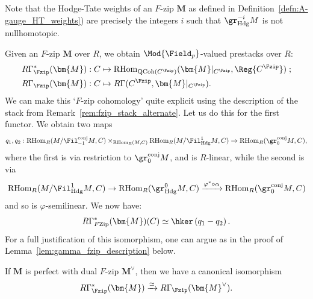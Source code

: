 \documentclass[10pt]{amsart}
\begin{document}
\begin{remark}
\label{rem:fzip_ht_weights}
Note that the Hodge-Tate weights of an $F$-zip $\bm{M}$ as defined in Definition~\ref{defn:A-gauge_HT_weights}) are precisely the integers $i$ such that $\gr^{-i}_{\mathrm{Hdg}}M$ is not nullhomotopic.
\end{remark}


\begin{construction}
\label{const:fzip_cohomology}
Given an $F$-zip $\bm{M}$ over $R$, we obtain $\Mod{\Field_p}$-valued prestacks over $R$:
\begin{align*}
R\Gamma^*_{\Fzip}(\bm{M}):C&\mapsto \mathrm{RHom}_{\mathrm{QCoh}(C^{\Fzip})}(\bm{M}\vert_{C^{\Fzip}},\Reg{C^{\Fzip}})\;;\\
R\Gamma_{\Fzip}(\bm{M}):C&\mapsto R\Gamma(C^{\Fzip},\bm{M}\vert_{C^{\Fzip}}).
\end{align*}
We can make this `$F$-zip cohomology' quite explicit using the description of the stack from Remark~\ref{rem:fzip_stack_alternate}. Let us do this for the first functor. We obtain two maps
\[
q_1,q_2:\mathrm{RHom}_{R}(M/\Fil^{\mathrm{conj}}_{-1}M,C)\times_{\mathrm{RHom}_R(M,C)}\mathrm{RHom}_{R}(M/\Fil^1_{\mathrm{Hdg}}M,C)\to \mathrm{RHom}_R(\gr^{\mathrm{conj}}_0M,C),
\]
where the first is via restriction to $\gr^{\mathrm{conj}}_0M$, and is $R$-linear, while the second is via 
\[
\mathrm{RHom}_{R}(M/\Fil_{\mathrm{Hdg}}^{1}M,C) \to\mathrm{RHom}_{R}(\gr^0_{\mathrm{Hdg}}M,C) \xrightarrow{\varphi^*\circ \alpha} \mathrm{RHom}_R(\gr^{\mathrm{conj}}_0M,C)
\]
and so is $\varphi$-semilinear. We now have:
\begin{align}
\label{eqn:section_fzips_perf_comp}
R\Gamma^*_{F\mathrm{Zip}}(\bm{M})(C) \simeq \hker\left(q_1-q_2\right).
\end{align}
For a full justification of this isomorphism, one can argue as in the proof of Lemma~\ref{lem:gamma_fzip_description} below.
\end{construction}

\begin{remark}
\label{rem:fzip_cohom-perfect_f-gauges}
If $\bm{M}$ is perfect with dual $F$-zip $\bm{M}^\vee$, then we have a canonical isomorphism
\[
R\Gamma^*_{\Fzip}(\bm{M})\xrightarrow{\simeq}R\Gamma_{\Fzip}(\bm{M}^\vee).
\]
\end{remark} 
\end{document}
